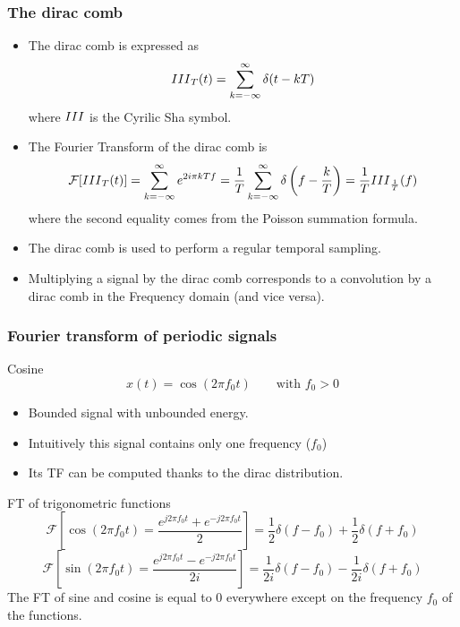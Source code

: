 \frametitle{The dirac comb}

\begin{itemize}
  \item The dirac comb is expressed as
  \begin{equation}
    {III}_T(t)=\sum_{k=-\infty}^\infty \delta(t-kT)
    \label{eq:dirac_comb}
  \end{equation}
  where ${III}$ is the Cyrilic Sha symbol.
  \item The Fourier Transform of the dirac comb is 
  \begin{equation}
    \mathcal{F}[{III}_T(t)]=\sum_{k=-\infty}^\infty e^{2i\pi k T f}= \frac{1}{T}\sum_{k=-\infty}^\infty \delta\left(f-\frac{k}{T}\right) =  \frac{1}{T}{III}_{\frac{1}{T}}(f)
    \label{eq:ft_dirac_comb}
  \end{equation}
  where the second equality comes from the Poisson summation formula.
  \item The dirac comb is used to perform a regular temporal sampling.
  \item Multiplying a signal by the dirac comb corresponds to a convolution by a dirac comb in the Frequency domain (and vice versa).
\end{itemize}


\frametitle{Fourier transform of periodic signals}


\begin{block}{Cosine}
$$
x(t)= \cos(2 \pi f_0 t) \quad \quad \text{with } f_0 > 0
$$
  \begin{itemize}
  \item Bounded signal with unbounded energy.
  \item Intuitively this signal contains only one frequency ($f_0$)
  \item Its TF can be computed thanks to the dirac distribution.
  \end{itemize}
\end{block}
\begin{block}{FT of trigonometric functions}
  $$
\mathcal{F}\left[\cos(2 \pi f_0 t) = \frac{e^{j2\pi f_0t} + e^{-j2\pi f_0t} }{2}\right]
= %
\frac{1}{2}\delta(f-f_0) + \frac{1}{2}\delta(f+f_0) 
$$
$$
\mathcal{F}\left[\sin(2 \pi f_0 t) = \frac{e^{j2\pi f_0t} - e^{-j2\pi f_0t} }{2i}\right]
= %
\frac{1}{2i}\delta(f-f_0) - \frac{1}{2i}\delta(f+f_0) 
$$
The FT of sine and cosine is equal to $0$ everywhere except on the frequency $f_0$ of the functions.
\end{block}




